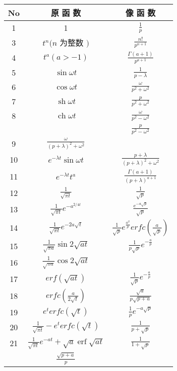 \begin{table}
    \centering
\begin{tabular}{|c|c|c|}
    \hline No & 原 函 数 & 像 函 数 \\
    \hline 1 & 1 & $\frac{1}{p}$ \\
    3 & $t^n(n$ 为整数 $)$ & $\frac{n !}{p^{n+1}}$ \\
    4 & $t^a(a>-1)$ & $\frac{\Gamma(a+1)}{p^{a+1}}$ \\
    5 & $\sin \omega t$ & $\frac{1}{p-\lambda}$ \\
    6 & $\cos \omega t$ & $\frac{\omega}{p^2+\omega^2}$ \\
    7 & $\operatorname{sh} \omega t$ & $\frac{p}{p^2+\omega^2}$ \\
    8 & $\operatorname{ch} \omega t$ & $\frac{\omega}{p^2-\omega^2}$ \\
    & & $\frac{p}{p^2-\omega^2}$ \\
    9 & $\frac{\omega}{(p+\lambda)^2+\omega^2}$ \\
    10 & $e^{-\lambda t} \sin \omega t$ & $\frac{p+\lambda}{(p+\lambda)^2+\omega^2}$ \\
    11 & $e^{-\lambda t} t^a$ & $\frac{\Gamma(a+1)}{(p+\lambda)^{a+1}}$ \\
    12 & $\frac{1}{\sqrt{\pi t}}$ & $\frac{1}{\sqrt{p}}$ \\
    13 & $\frac{1}{\sqrt{\pi t}} e^{-a^{2 / 4 t}}$ & $\frac{e^{-a \sqrt{p}}}{\sqrt{p}}$ \\
    14 & $\frac{1}{\sqrt{\pi t}} e^{-2 a \sqrt{t}}$ & $\frac{1}{\sqrt{p}} e^{\frac{a^2}{p}} erfc\left(\frac{a}{\sqrt{p}}\right)$ \\
    15 & $\frac{1}{\sqrt{\pi a}} \sin 2 \sqrt{a t}$ & $\frac{1}{p \sqrt{p}} e^{-\frac{a}{p}}$ \\
    16 & $\frac{1}{\sqrt{\pi a}} \cos 2 \sqrt{a t}$ \\
    17 & $erf(\sqrt{a t})$ & $\frac{1}{\sqrt{p}} e^{-\frac{a}{p}}$ \\
    18 & $erfc\left(\frac{a}{2 \sqrt{t}}\right)$ & $\frac{\sqrt{a}}{p \sqrt{p+a}}$ \\
    19 & $e^t erfc(\sqrt{t})$ & $\frac{1}{p} e^{-a \sqrt{p}}$ \\
    20 & $\frac{1}{\sqrt{\pi t}}-e^t erfc(\sqrt{t})$ & $\frac{1}{p+\sqrt{p}}$ \\
    21 & $\frac{1}{\sqrt{\pi t}} e^{-a t}+\sqrt{a} \operatorname{erf} \sqrt{a t}$ & $\frac{1}{1+\sqrt{p}}$ \\
    & $\frac{\sqrt{p+a}}{p}$ \\

\end{tabular}
\end{table}
